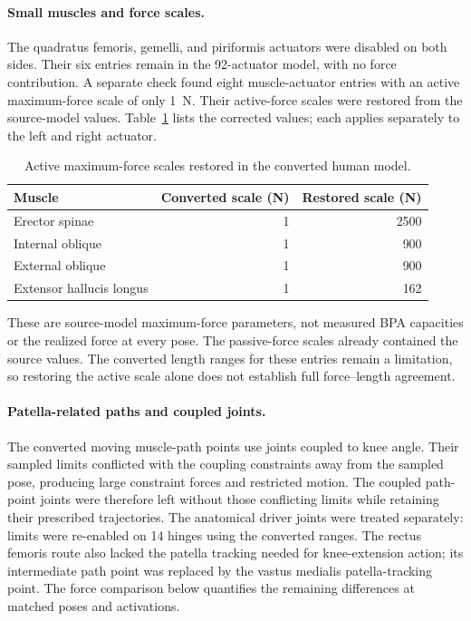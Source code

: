 \paragraph{Small muscles and force scales.}
The quadratus femoris, gemelli, and piriformis actuators were disabled on both sides. Their six entries remain in the 92-actuator model, with no force contribution. A separate check found eight muscle-actuator entries with an active maximum-force scale of only \qty{1}{\newton}. Their active-force scales were restored from the source-model values. Table~\ref{tab:app_force_scale_repairs} lists the corrected values; each applies separately to the left and right actuator.

\begin{table}[htbp]
\centering
\caption{Active maximum-force scales restored in the converted human model.}
\label{tab:app_force_scale_repairs}
\begin{tabular}{@{}lrr@{}}
\toprule
Muscle & Converted scale (\unit{\newton}) & Restored scale (\unit{\newton}) \\
\midrule
Erector spinae & 1 & 2500 \\
Internal oblique & 1 & 900 \\
External oblique & 1 & 900 \\
Extensor hallucis longus & 1 & 162 \\
\bottomrule
\end{tabular}
\end{table}

These are source-model maximum-force parameters, not measured BPA capacities or the realized force at every pose. The passive-force scales already contained the source values. The converted length ranges for these entries remain a limitation, so restoring the active scale alone does not establish full force--length agreement.

\paragraph{Patella-related paths and coupled joints.}
The converted moving muscle-path points use joints coupled to knee angle. Their sampled limits conflicted with the coupling constraints away from the sampled pose, producing large constraint forces and restricted motion. The coupled path-point joints were therefore left without those conflicting limits while retaining their prescribed trajectories. The anatomical driver joints were treated separately: limits were re-enabled on 14 hinges using the converted ranges. The rectus femoris route also lacked the patella tracking needed for knee-extension action; its intermediate path point was replaced by the vastus medialis patella-tracking point. The force comparison below quantifies the remaining differences at matched poses and activations.

